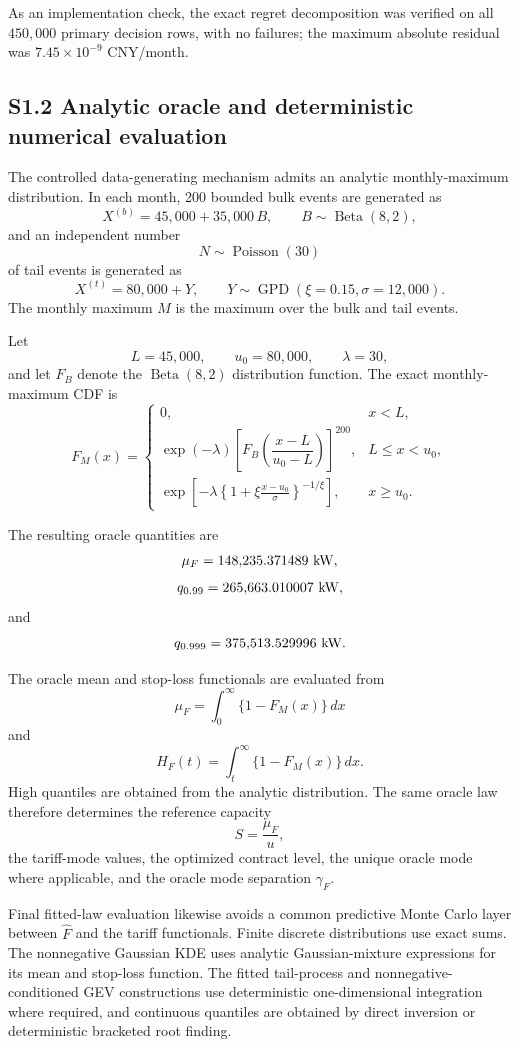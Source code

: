 \documentclass[]{interact}
\begin{document}
As an implementation check, the exact regret decomposition was
verified on all $450{,}000$ primary decision rows, with no failures;
the maximum absolute residual was
$7.45\times10^{-9}$ CNY/month.

\subsection*{S1.2 Analytic oracle and deterministic numerical evaluation}

The controlled data-generating mechanism admits an analytic
monthly-maximum distribution. In each month, 200 bounded bulk events
are generated as
\[
X^{(b)}
=
45{,}000+35{,}000\,B,
\qquad
B\sim\operatorname{Beta}(8,2),
\]
and an independent number
\[
N\sim\operatorname{Poisson}(30)
\]
of tail events is generated as
\[
X^{(t)}
=
80{,}000+Y,
\qquad
Y\sim\operatorname{GPD}(\xi=0.15,\sigma=12{,}000).
\]
The monthly maximum \(M\) is the maximum over the bulk and tail
events.

Let
\[
L=45{,}000,
\qquad
u_0=80{,}000,
\qquad
\lambda=30,
\]
and let \(F_B\) denote the
\(\operatorname{Beta}(8,2)\) distribution function. The exact
monthly-maximum CDF is
\[
F_M(x)
=
\begin{cases}
0,
&
x<L,
\\[4pt]
\exp(-\lambda)
\left[
F_B\!\left(
\dfrac{x-L}{u_0-L}
\right)
\right]^{200},
&
L\leq x<u_0,
\\[10pt]
\displaystyle
\exp\left[
-\lambda
\left\{
1+\xi\frac{x-u_0}{\sigma}
\right\}^{-1/\xi}
\right],
&
x\geq u_0.
\end{cases}
\]

The resulting oracle quantities are
\[
\mu_F
=
148{,}235.371489\ {\rm kW},
\]
\[
q_{0.99}
=
265{,}663.010007\ {\rm kW},
\]
and
\[
q_{0.999}
=
375{,}513.529996\ {\rm kW}.
\]

The oracle mean and stop-loss functionals are evaluated from
\[
\mu_F
=
\int_0^\infty
\{1-F_M(x)\}\,dx
\]
and
\[
H_F(t)
=
\int_t^\infty
\{1-F_M(x)\}\,dx.
\]
High quantiles are obtained from the analytic distribution. The same
oracle law therefore determines the reference capacity
\[
S=\frac{\mu_F}{u},
\]
the tariff-mode values, the optimized contract level, the unique
oracle mode where applicable, and the oracle mode separation
\(\gamma_F\).

Final fitted-law evaluation likewise avoids a common predictive
Monte Carlo layer between \(\widehat F\) and the tariff functionals.
Finite discrete distributions use exact sums. The nonnegative
Gaussian KDE uses analytic Gaussian-mixture expressions for its mean
and stop-loss function. The fitted tail-process and
nonnegative-conditioned GEV constructions use deterministic
one-dimensional integration where required, and continuous quantiles
are obtained by direct inversion or deterministic bracketed root
finding.
\end{document}
